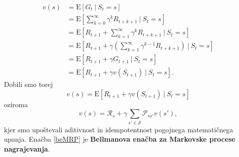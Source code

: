 \documentclass[12pt,a4paper]{amsart}
\theoremstyle{definition} %
\theoremstyle{plain} %
\begin{document}
\begin{align*}
    v(s) &= \mathrm{E} [G_t~|~S_t = s] \\
         &= \mathrm{E} [\sum_{k=0}^\infty \gamma^k R_{t + k + 1}~|~S_t = s] \\
         &= \mathrm{E} [R_{t+1} + \sum_{k=1}^\infty \gamma^k R_{t + k + 1}~|~S_t = s] \\
         &= \mathrm{E} [R_{t+1} + \gamma(\sum_{k=1}^\infty \gamma^{k-1} R_{t + k + 1})~|~S_t = s] \\
         &= \mathrm{E} [R_{t+1} + \gamma G_{t+1}~|~S_t = s] \\
         &= \mathrm{E} [R_{t+1} + \gamma v(S_{t+1})~|~S_t = s].
\end{align*}
Dobili smo torej 
$$
v(s) = \mathrm{E} [R_{t+1} + \gamma v(S_{t+1})~|~S_t = s]
$$
oziroma %
\begin{equation}\label{beMRP}
    v(s) = \mathcal{R}_s + \gamma \sum_{s' \in \mathcal{S}} \mathcal{P}_{ss'} v(s'),
\end{equation} 
kjer smo upoštevali aditivnost in idempotentnost pogojnega matematičnega upanja. Enačba \eqref{beMRP}
je \textbf{Bellmanova enačba za Markovske procese nagrajevanja}.
\end{document}
